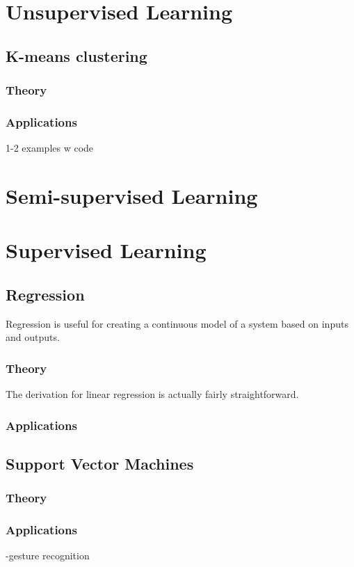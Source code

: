 \documentclass[11pt]{article}
\begin{document}
\section{Unsupervised Learning}
\subsection{K-means clustering}
\subsubsection{Theory}
\subsubsection{Applications}
1-2 examples w code

\section{Semi-supervised Learning}

\section{Supervised Learning}
\subsection{Regression}
Regression is useful for creating a continuous model of a system based on inputs and outputs.
\subsubsection{Theory}
The derivation for linear regression is actually fairly straightforward.
\subsubsection{Applications}

\subsection{Support Vector Machines}
\subsubsection{Theory}
\subsubsection{Applications}
-gesture recognition
\end{document}
